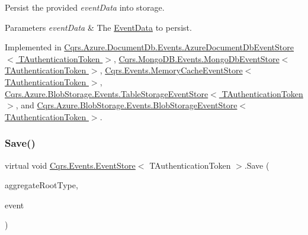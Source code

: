 Persist the provided {\itshape event\+Data}  into storage. 


\begin{DoxyParams}{Parameters}
{\em event\+Data} & The \hyperlink{classCqrs_1_1Events_1_1EventData}{Event\+Data} to persist.\\
\hline
\end{DoxyParams}


Implemented in \hyperlink{classCqrs_1_1Azure_1_1DocumentDb_1_1Events_1_1AzureDocumentDbEventStore_afe494469614082cf667f5cf4b6c4a97b_afe494469614082cf667f5cf4b6c4a97b}{Cqrs.\+Azure.\+Document\+Db.\+Events.\+Azure\+Document\+Db\+Event\+Store$<$ T\+Authentication\+Token $>$}, \hyperlink{classCqrs_1_1MongoDB_1_1Events_1_1MongoDbEventStore_a13f6823671d7cb9c042d8f7156a51b89_a13f6823671d7cb9c042d8f7156a51b89}{Cqrs.\+Mongo\+D\+B.\+Events.\+Mongo\+Db\+Event\+Store$<$ T\+Authentication\+Token $>$}, \hyperlink{classCqrs_1_1Events_1_1MemoryCacheEventStore_a9b1a1aaab34770bd68ebcedca0fc40b0_a9b1a1aaab34770bd68ebcedca0fc40b0}{Cqrs.\+Events.\+Memory\+Cache\+Event\+Store$<$ T\+Authentication\+Token $>$}, \hyperlink{classCqrs_1_1Azure_1_1BlobStorage_1_1Events_1_1TableStorageEventStore_ae63921d0ace265b1b269c865080b5712_ae63921d0ace265b1b269c865080b5712}{Cqrs.\+Azure.\+Blob\+Storage.\+Events.\+Table\+Storage\+Event\+Store$<$ T\+Authentication\+Token $>$}, and \hyperlink{classCqrs_1_1Azure_1_1BlobStorage_1_1Events_1_1BlobStorageEventStore_aa27a352076b8967498407d24814f7c83_aa27a352076b8967498407d24814f7c83}{Cqrs.\+Azure.\+Blob\+Storage.\+Events.\+Blob\+Storage\+Event\+Store$<$ T\+Authentication\+Token $>$}.

\mbox{\label{classCqrs_1_1Events_1_1EventStore_a3ba5ba04a36382b6d36a6ad8867dc766_a3ba5ba04a36382b6d36a6ad8867dc766}} 
\subsubsection{\texorpdfstring{Save()}{Save()}}
{\footnotesize\ttfamily virtual void \hyperlink{classCqrs_1_1Events_1_1EventStore}{Cqrs.\+Events.\+Event\+Store}$<$ T\+Authentication\+Token $>$.Save (\begin{DoxyParamCaption}\item[{Type}]{aggregate\+Root\+Type,  }\item[{\hyperlink{interfaceCqrs_1_1Events_1_1IEvent}{I\+Event}$<$ T\+Authentication\+Token $>$ @}]{event }\end{DoxyParamCaption})\hspace{0.3cm}{\ttfamily [virtual]}}



